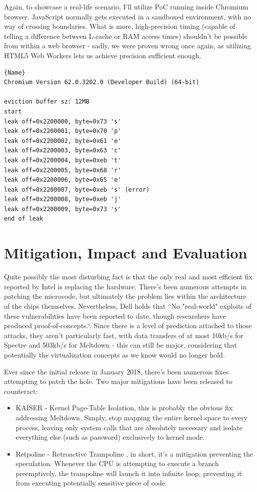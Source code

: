 \documentclass{article}
\begin{document}
Again, to showcase a real-life scenario, I'll utilize PoC running inside Chromium browser. JavaScript normally gets executed in a sandboxed environment, with no way of crossing boundaries. What is more, high-precision timing (capable of telling a difference between L-cache or RAM access times) shouldn't be possible from within a web browser - sadly, we were proven wrong once again, as utilizing HTML5 Web Workers lets us achieve precision sufficient enough. 
\begin{lstlisting}[caption=Javascript leaking information\cite{spectrechrome},frame=tlrb]{Name}
Chromium Version 62.0.3202.0 (Developer Build) (64-bit)

eviction buffer sz: 12MB
start
leak off=0x2200000, byte=0x73 's'
leak off=0x2200001, byte=0x70 'p'
leak off=0x2200002, byte=0x61 'e'
leak off=0x2200003, byte=0x63 'c'
leak off=0x2200004, byte=0xeb 't'
leak off=0x2200005, byte=0x68 'r'
leak off=0x2200006, byte=0x65 'e'
leak off=0x2200007, byte=0xeb 's' (error)
leak off=0x2200008, byte=0xeb 'j'
leak off=0x2200009, byte=0x73 's'
end of leak
\end{lstlisting}

\section{Mitigation, Impact and Evaluation}
Quite possibly the most disturbing fact is that the only real and most efficient fix reported by Intel is replacing the hardware. There's been numerous attempts in patching the microcode, but ultimately the problem lies within the architecture of the chips themselves. Nevertheless, Dell holds that ``No "real-world" exploits of these vulnerabilities have been reported to date, though researchers have produced proof-of-concepts.``\cite{dell}. Since there is a level of prediction attached to those attacks, they aren't particularly fast, with data transfers of at most 10kb/s for Spectre and 503kb/s for Meltdown \cite{kocher2018spectre}\cite{lipp2018meltdown} - this can still be major, considering that potentially the virtualization concepts as we know would no longer hold.

Ever since the initial release in January 2018, there's been numerous fixes attempting to patch the hole. Two major mitigations have been released to counteract:
\begin{itemize}
  \item KAISER - Kernel Page-Table Isolation, this is probably the obvious fix addressing Meltdown. Simply, stop mapping the entire kernel space to every process, leaving only system calls that are absolutely necessary and isolate everything else (such as password) exclusively to kernel mode.
  \item Retpoline - Retroactive Trampoline \cite{turner2018retpoline}, in short, it's a mitigation preventing the speculation. Whenever the CPU is attempting to execute a branch preemptively, the trampoline will launch it into infinite loop, preventing it from executing potentially sensitive piece of code.
\end{itemize}
\end{document}

